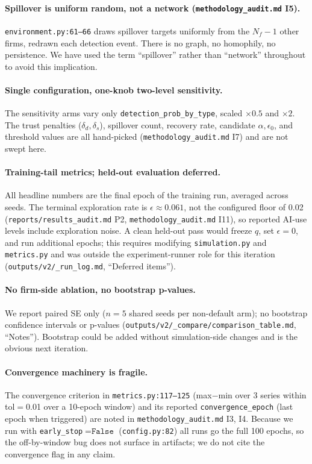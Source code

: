 \documentclass[11pt]{article}
\begin{document}
\paragraph{Spillover is uniform random, not a network
(\texttt{methodology\_audit.md} I5).}
\texttt{environment.py:61--66} draws spillover targets uniformly from the
\(N_{f}-1\) other firms, redrawn each detection event. There is no graph,
no homophily, no persistence. We have used the term ``spillover'' rather
than ``network'' throughout to avoid this implication.

\paragraph{Single configuration, one-knob two-level sensitivity.}
The sensitivity arms vary only \texttt{detection\_prob\_by\_type}, scaled
\(\times 0.5\) and \(\times 2\). The trust penalties
(\(\delta_{d}, \delta_{s}\)), spillover count, recovery rate, candidate
\(\alpha, \epsilon_{0}\), and threshold values are all hand-picked
(\texttt{methodology\_audit.md} I7) and are not swept here.

\paragraph{Training-tail metrics; held-out evaluation deferred.}
All headline numbers are the final epoch of the training run, averaged
across seeds. The terminal exploration rate is \(\epsilon \approx 0.061\),
not the configured floor of 0.02 (\texttt{reports/results\_audit.md} P2,
\texttt{methodology\_audit.md} I11), so reported AI-use levels include
exploration noise. A clean held-out pass would freeze \(q\), set
\(\epsilon=0\), and run additional epochs; this requires modifying
\texttt{simulation.py} and \texttt{metrics.py} and was outside the
experiment-runner role for this iteration
(\texttt{outputs/v2/\_run\_log.md}, ``Deferred items'').

\paragraph{No firm-side ablation, no bootstrap p-values.}
We report paired SE only (\(n=5\) shared seeds per non-default arm); no
bootstrap confidence intervals or p-values
(\texttt{outputs/v2/\_compare/comparison\_table.md}, ``Notes'').
Bootstrap could be added without simulation-side changes and is the
obvious next iteration.

\paragraph{Convergence machinery is fragile.}
The convergence criterion in \texttt{metrics.py:117--125} (max\(-\)min over
3 series within tol\(=\)0.01 over a 10-epoch window) and its reported
\texttt{convergence\_epoch} (last epoch when triggered) are noted in
\texttt{methodology\_audit.md} I3, I4. Because we run with
\texttt{early\_stop}\(=\texttt{False}\) (\texttt{config.py:82}) all runs
go the full 100 epochs, so the off-by-window bug does not surface in
artifacts; we do not cite the convergence flag in any claim.
\end{document}
